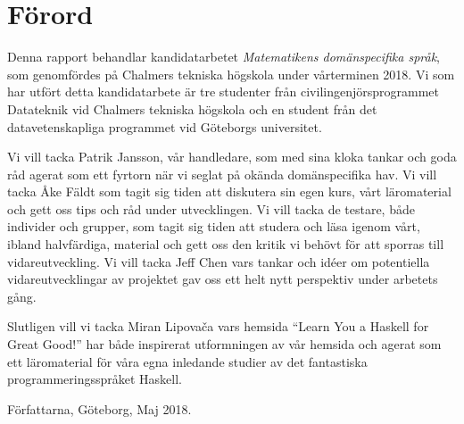 \thispagestyle{plain}			%
\section*{Förord}

Denna rapport behandlar kandidatarbetet \textit{Matematikens domänspecifika språk},
som genomfördes på Chalmers tekniska högskola under vårterminen 2018. Vi som har
utfört detta kandidatarbete är tre studenter från civilingenjörsprogrammet
Datateknik vid Chalmers tekniska högskola och en student från det
datavetenskapliga programmet vid Göteborgs universitet.

Vi vill tacka Patrik Jansson, vår handledare, som med sina kloka tankar och goda
råd agerat som ett fyrtorn när vi seglat på okända domänspecifika hav. Vi vill
tacka Åke Fäldt som tagit sig tiden att diskutera sin egen kurs, vårt
läromaterial och gett oss tips och råd under utvecklingen. Vi vill tacka de
testare, både individer och grupper, som tagit sig tiden att studera och läsa
igenom vårt, ibland halvfärdiga, material och gett oss den kritik vi behövt för
att sporras till vidareutveckling. Vi vill tacka Jeff Chen vars tankar och idéer
om potentiella vidareutvecklingar av projektet gav oss ett helt nytt perspektiv
under arbetets gång.

Slutligen vill vi tacka Miran Lipovača vars hemsida ``Learn You a
Haskell for Great Good!'' har både inspirerat utformningen av vår hemsida och
agerat som ett läromaterial för våra egna inledande studier av det fantastiska
programmeringsspråket Haskell. 

\vspace{1.5cm}
\hfill
Författarna, Göteborg, Maj 2018.

\newpage				%
\thispagestyle{empty}
\mbox{}
